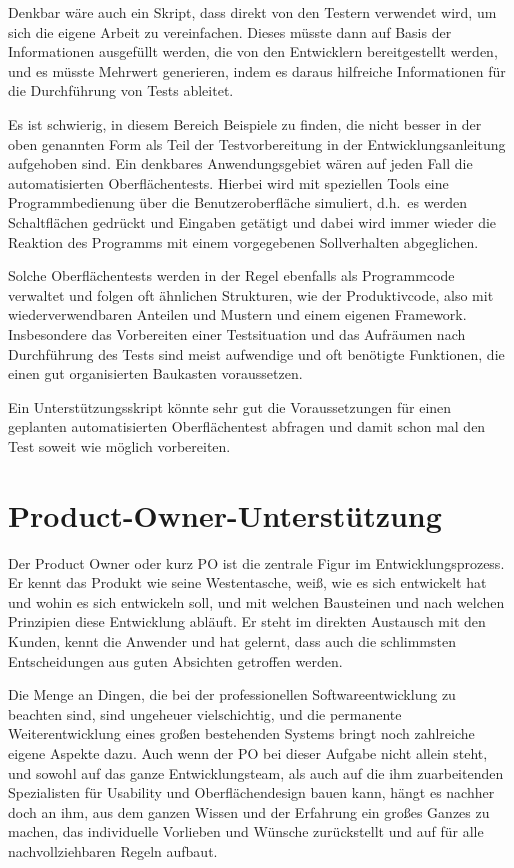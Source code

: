 Denkbar wäre auch ein Skript, dass direkt von den Testern verwendet wird, um sich die eigene Arbeit zu vereinfachen. Dieses müsste dann auf Basis der Informationen ausgefüllt werden, die von den Entwicklern bereitgestellt werden, und es müsste Mehrwert generieren, indem es daraus hilfreiche Informationen für die Durchführung von Tests ableitet.

Es ist schwierig, in diesem Bereich Beispiele zu finden, die nicht besser in der oben genannten Form als Teil der Testvorbereitung in der Entwicklungsanleitung aufgehoben sind. Ein denkbares Anwendungsgebiet wären auf jeden Fall die automatisierten Oberflächentests. Hierbei wird mit speziellen Tools eine Programmbedienung über die Benutzeroberfläche simuliert, d.h.\ es werden Schaltflächen gedrückt und Eingaben getätigt und dabei wird immer wieder die Reaktion des Programms mit einem vorgegebenen Sollverhalten abgeglichen.

Solche Oberflächentests werden in der Regel ebenfalls als Programmcode verwaltet und folgen oft ähnlichen Strukturen, wie der Produktivcode, also mit wiederverwendbaren Anteilen und Mustern und einem eigenen Framework. Insbesondere das Vorbereiten einer Testsituation und das Aufräumen nach Durchführung des Tests sind meist aufwendige und oft benötigte Funktionen, die einen gut organisierten Baukasten voraussetzen.

Ein Unterstützungsskript könnte sehr gut die Voraussetzungen für einen geplanten automatisierten Oberflächentest abfragen und damit schon mal den Test soweit wie möglich vorbereiten.

\section{Product-Owner-Unterstützung}\label{POUnterstuetzung}
Der Product Owner oder kurz PO ist die zentrale Figur im Entwicklungsprozess. Er kennt das Produkt wie seine Westentasche, weiß, wie es sich entwickelt hat und wohin es sich entwickeln soll, und mit welchen Bausteinen und nach welchen Prinzipien diese Entwicklung abläuft. Er steht im direkten Austausch mit den Kunden, kennt die Anwender und hat gelernt, dass auch die schlimmsten Entscheidungen aus guten Absichten getroffen werden.

Die Menge an Dingen, die bei der professionellen Softwareentwicklung zu beachten sind, sind ungeheuer vielschichtig, und die permanente Weiterentwicklung eines großen bestehenden Systems bringt noch zahlreiche eigene Aspekte dazu. Auch wenn der PO bei dieser Aufgabe nicht allein steht, und sowohl auf das ganze Entwicklungsteam, als auch auf die ihm zuarbeitenden Spezialisten für Usability und Oberflächendesign bauen kann, hängt es nachher doch an ihm, aus dem ganzen Wissen und der Erfahrung ein großes Ganzes zu machen, das individuelle Vorlieben und Wünsche zurückstellt und auf für alle nachvollziehbaren Regeln aufbaut.

